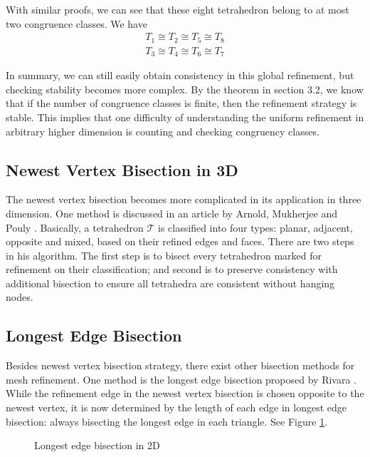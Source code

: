 With similar proofs, we can see that these eight tetrahedron belong to at most two congruence classes. We have
\begin{align*}
T_1 \cong T_2 \cong T_5 \cong T_8 \\
T_3 \cong T_4 \cong T_6 \cong T_7
\end{align*}

In summary, we can still easily obtain consistency in this global refinement, but checking stability becomes more complex. By the theorem in section 3.2, we know that if the number of congruence classes is finite, then the refinement strategy is stable. This implies that one difficulty of understanding the uniform refinement in arbitrary higher dimension is counting and checking congruency classes.

\subsection{Newest Vertex Bisection in 3D}
The newest vertex bisection becomes more complicated in its application in three dimension. One method is discussed in an article by Arnold, Mukherjee and Pouly \cite{arnold2000locally}. 
Basically, a tetrahedron $\mathcal T$ is classified into four types: planar, adjacent, opposite and mixed, based on their refined edges and faces. There are two steps in his algorithm. The first step is to bisect every tetrahedron marked for refinement on their classification; and second is to preserve consistency with additional bisection to ensure all tetrahedra are consistent without hanging nodes.

\subsection{Longest Edge Bisection}
Besides newest vertex bisection strategy, there exist other bisection methods for mesh refinement. One method is the longest edge bisection proposed by Rivara \cite{rivara1984mesh}. While the refinement edge in the newest vertex bisection is chosen opposite to the newest vertex, it is now determined by the length of each edge in longest edge bisection: always bisecting the longest edge in each triangle. See Figure \ref{Fig14}.

\begin{figure}[h!]
\centering
{}
\caption{Longest edge bisection in 2D}
\label{Fig14}
\end{figure}

